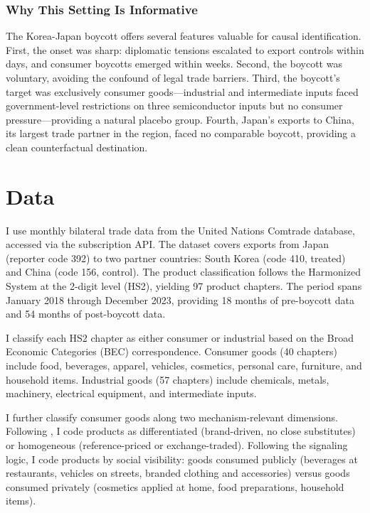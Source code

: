 \documentclass[12pt]{article}
\begin{document}
\subsubsection*{Why This Setting Is Informative} The Korea-Japan boycott offers several features valuable for causal identification. First, the onset was sharp: diplomatic tensions escalated to export controls within days, and consumer boycotts emerged within weeks. Second, the boycott was voluntary, avoiding the confound of legal trade barriers. Third, the boycott's target was exclusively consumer goods---industrial and intermediate inputs faced government-level restrictions on three semiconductor inputs but no consumer pressure---providing a natural placebo group. Fourth, Japan's exports to China, its largest trade partner in the region, faced no comparable boycott, providing a clean counterfactual destination.


\section{Data}

I use monthly bilateral trade data from the United Nations Comtrade database, accessed via the subscription API. The dataset covers exports from Japan (reporter code 392) to two partner countries: South Korea (code 410, treated) and China (code 156, control). The product classification follows the Harmonized System at the 2-digit level (HS2), yielding 97 product chapters. The period spans January 2018 through December 2023, providing 18 months of pre-boycott data and 54 months of post-boycott data.

I classify each HS2 chapter as either consumer or industrial based on the Broad Economic Categories (BEC) correspondence. Consumer goods (40 chapters) include food, beverages, apparel, vehicles, cosmetics, personal care, furniture, and household items. Industrial goods (57 chapters) include chemicals, metals, machinery, electrical equipment, and intermediate inputs.

I further classify consumer goods along two mechanism-relevant dimensions. Following \citet{rauch1999networks}, I code products as differentiated (brand-driven, no close substitutes) or homogeneous (reference-priced or exchange-traded). Following the signaling logic, I code products by social visibility: goods consumed publicly (beverages at restaurants, vehicles on streets, branded clothing and accessories) versus goods consumed privately (cosmetics applied at home, food preparations, household items).
\end{document}
